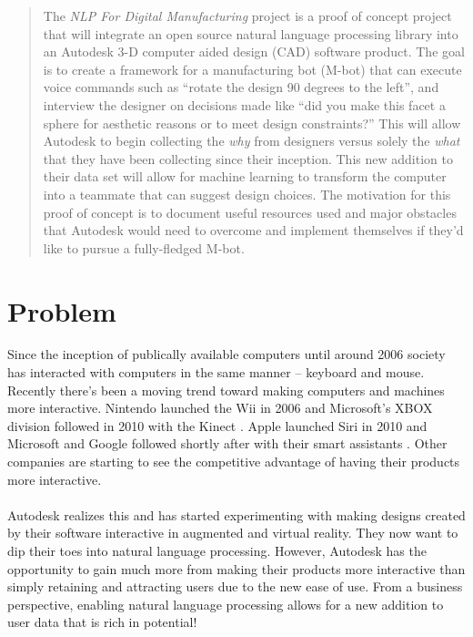 \documentclass[onecolumn, draftclsnofoot,10pt, compsoc]{IEEEtran}
\begin{document}
\begin{titlepage}
\begin{singlespace}
\begin{abstract}
        	The \textit{NLP For Digital Manufacturing} project is a proof of concept project that will integrate an open source natural language processing library into an Autodesk 3-D computer aided design (CAD) software product. The goal is to create a framework for a manufacturing bot (M-bot) that can execute voice commands such as “rotate the design 90 degrees to the left”, and interview the designer on decisions made like “did you make this facet a sphere for aesthetic reasons or to meet design constraints?” This will allow Autodesk to begin collecting the \textit{why} from designers versus solely the \textit{what} that they have been collecting since their inception. This new addition to their data set will allow for machine learning to transform the computer into a teammate that can suggest design choices. The motivation for this proof of concept is to document useful resources used and major obstacles that Autodesk would need to overcome and implement themselves if they’d like to pursue a fully-fledged M-bot.
        \end{abstract}     
    \end{singlespace}
\end{titlepage}
\newpage
{}
\tableofcontents
\clearpage

\section{Problem}
Since the inception of publically available computers until around 2006 society has interacted with computers in the same manner – keyboard and mouse. Recently there’s been a moving trend toward making computers and machines more interactive. Nintendo launched the Wii in 2006 and Microsoft’s XBOX division followed in 2010 with the Kinect \cite{wii}\cite{kinect}. Apple launched Siri in 2010 and Microsoft and Google followed shortly after with their smart assistants \cite{siri}. Other companies are starting to see the competitive advantage of having their products more interactive.
\\ \\
Autodesk realizes this and has started experimenting with making designs created by their software interactive in augmented and virtual reality. They now want to dip their toes into natural language processing. However, Autodesk has the opportunity to gain much more from making their products more interactive than simply retaining and attracting users due to the new ease of use. From a business perspective, enabling natural language processing allows for a new addition to user data that is rich in potential!
\end{document}
